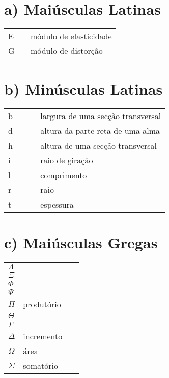 \section*{a) Maiúsculas Latinas}
    \begin{flushleft}
        \begin{tabular}{l p{0.8\linewidth}}
        E      & módulo de elasticidade\\
        G      & módulo de distorção
        \end{tabular}
    \end{flushleft}
    
\section*{b) Minúsculas Latinas}
    \begin{flushleft}
        \begin{tabular}{l p{0.8\linewidth}}
        b      & largura de uma secção transversal\\
        d      & altura da parte reta de uma alma\\
        h      & altura de uma secção transversal\\
        i      & raio de giração\\
        l      & comprimento\\
        r      & raio\\
        t      & espessura
        \end{tabular}
    \end{flushleft}
    
\section*{c) Maiúsculas Gregas}
    \begin{flushleft}
        \begin{tabular}{l p{0.8\linewidth}}
        $\Lambda$  & \\
        $\Xi$      & \\
        $\Phi$     & \\
        $\Psi$     & \\
        $\Pi$      & produtório\\
        $\Theta$   & \\
        $\Gamma$   & \\
        $\Delta$   & incremento\\
        $\Omega$   & área\\
        $\Sigma$   & somatório
        \end{tabular}
    \end{flushleft}
    
